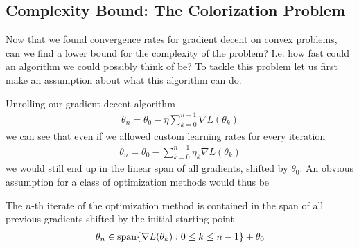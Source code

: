 
\subsection{Complexity Bound: The Colorization Problem}

Now that we found convergence rates for gradient decent on convex problems, can
we find a lower bound for the complexity of the problem? I.e. how fast could
an algorithm we could possibly think of be? To tackle this problem let us first
make an assumption about what this algorithm can do.

Unrolling our gradient decent algorithm
%
\begin{align*}
	\theta_n = \theta_0 - \eta\sum_{k=0}^{n-1} \nabla L(\theta_k)
\end{align*}
%
we can see that even if we allowed custom learning rates for every iteration
%
\begin{align*}
	\theta_n = \theta_0 - \sum_{k=0}^{n-1} \eta_k \nabla L(\theta_k)
\end{align*}
%
we would still end up in the linear span of all gradients, shifted by \(\theta_0\).
An obvious assumption for a class of optimization methods would thus be
%
\begin{assumption}
	\label{assmpt: parameter in linear hull of gradients}
	The \(n\)-th iterate of the optimization method is contained in the span of all
	previous gradients shifted by the initial starting point
	\begin{align*}
		\theta_n \in \text{span}\{\nabla L(\theta_k) : 0\le k \le n-1\} + \theta_0
	\end{align*}
\end{assumption}

